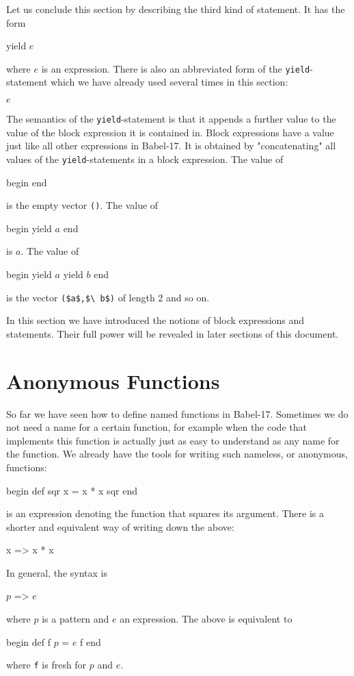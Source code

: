 \documentclass[11pt]{amsart}
\newcommand{\babelsrc}[1] {\lstinline!#1!}
\begin{document}
Let us conclude this section by describing the third kind of statement. It has the form
\begin{babellisting}
yield $e$
\end{babellisting}
where $e$ is an expression. There is also an abbreviated form of the \babelsrc{yield}-statement which we have already used several times in this section:
\begin{babellisting}
$e$
\end{babellisting}
The semantics of the \babelsrc{yield}-statement is that it appends a further value to the value of the block expression it is contained in. Block expressions have a value just like all other expressions in Babel-17. It is obtained by "concatenating" all values of the \babelsrc{yield}-statements in a block expression. The value of 
\begin{babellisting}
begin
end
\end{babellisting}
is the empty vector \babelsrc{()}. The value of 
\begin{babellisting}
begin
  yield $a$
end
\end{babellisting}
is $a$. The value of 
\begin{babellisting}
begin
  yield $a$
  yield $b$
end
\end{babellisting}
is the vector \babelsrc{($a$,$\ b$)} of length 2 and so on. 

In this section we have introduced the notions of block expressions and statements. Their full power will be revealed in later sections of this document.

\section{Anonymous Functions}
So far we have seen how to define named functions in Babel-17. Sometimes we do not need a name for a certain function, for example when the code that implements this function is actually just as easy to understand as any name for the function. We already have the tools for writing such nameless, or anonymous, functions:
\begin{babellisting}
begin
  def sqr x = x * x 
  sqr
end
\end{babellisting}
is an expression denoting the function that squares its argument. There is a shorter and equivalent way of writing down the above:
\begin{babellisting}
x => x * x
\end{babellisting}
In general, the syntax is
\begin{babellisting}
$p$ => $e$
\end{babellisting}
where $p$ is a pattern and $e$ an expression. The above is equivalent to
\begin{babellisting}
begin
  def f $p$ = $e$ 
  f
end
\end{babellisting}
where \babelsrc{f} is fresh for $p$ and $e$.
\end{document}
